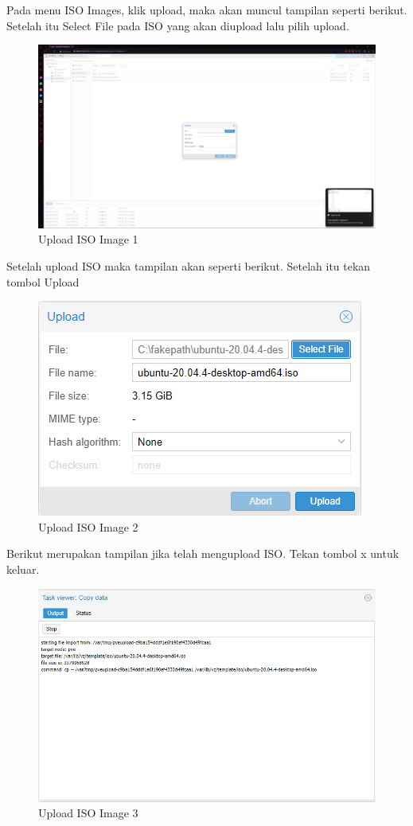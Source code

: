 \documentclass{article}
\begin{document}
  Pada menu ISO Images, klik upload, maka akan muncul tampilan seperti berikut. Setelah itu Select File pada ISO yang akan diupload lalu pilih upload.
  \begin{figure}[h!]
    \centering
    \includegraphics[width=0.7\linewidth]{upload iso 2.png}
    \caption{Upload ISO Image 1}
  \end{figure}

  Setelah upload ISO maka tampilan akan seperti berikut. Setelah itu tekan tombol Upload
  \begin{figure}[h!]
    \centering
    \includegraphics[width=0.7\linewidth]{upload iso 3.png}
    \caption{Upload ISO Image 2}
  \end{figure}
  \newpage
  
  Berikut merupakan tampilan jika telah mengupload ISO. Tekan tombol x untuk keluar.
  \begin{figure}[h!]
    \centering
    \includegraphics[width=0.7\linewidth]{upload iso 4.png}
    \caption{Upload ISO Image 3}
  \end{figure}
  \newpage
\end{document}
